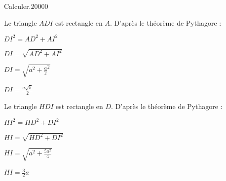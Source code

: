 \begin{pageParcoursd}
\begin{ExoCdN}{Calculer.}{2}{0}{0}{0}{0}
\begin{minipage}{0.6\linewidth}
Le triangle $ADI$ est rectangle en $A$. D'après le théorème de Pythagore :

$DI^2=AD^2+AI^2$

$DI=\sqrt{AD^2+AI^2}$

$DI=\sqrt{a^2+\frac{a}{2}^2}$

$DI=\frac{a\sqrt{5}}{2}$

Le triangle $HDI$ est rectangle en $D$. D'après le théorème de Pythagore :

$HI^2=HD^2+DI^2$

$HI=\sqrt{HD^2+DI^2}$

$HI=\sqrt{a^2+\frac{5a^2}{4}}$

$HI=\frac{3}{2}a$
\end{minipage}
\end{ExoCdN}




\end{pageParcoursd} %


